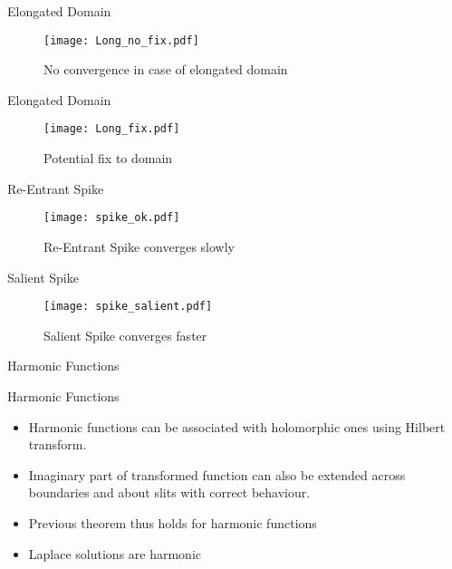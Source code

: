 \documentclass[envcountsect notes]{beamer}       %
\begin{document}
\begin{frame}{Elongated Domain}
    \begin{figure}[t]
        \vspace{-1em}
        \texttt{[image: Long\_no\_fix.pdf]}
        \vspace{-3em}
        \caption*{No convergence in case of elongated domain}
    \end{figure}
\end{frame}
\begin{frame}{Elongated Domain}
    \begin{figure}[t]
        \vspace{-1em}
        \texttt{[image: Long\_fix.pdf]}
        \vspace{-3em}
        \caption*{Potential fix to domain}
    \end{figure}
\end{frame}
\begin{frame}{Re-Entrant Spike}
    \begin{figure}[t]
        \vspace{-1em}
        \texttt{[image: spike\_ok.pdf]}
        \vspace{-3em}
        \caption*{Re-Entrant Spike converges slowly}
    \end{figure}
\end{frame}
\begin{frame}{Salient Spike}
    \begin{figure}[t]
        \vspace{-1em}
        \texttt{[image: spike\_salient.pdf]}
        \vspace{-3em}
        \caption*{Salient Spike converges faster}
    \end{figure}
\end{frame}

\begin{frame}{Harmonic Functions }
    \begin{block}{Harmonic Functions}
        \begin{itemize}
            \item Harmonic functions can be associated with holomorphic ones using Hilbert transform.
            \item Imaginary part of transformed function can also be extended across boundaries and about slits with correct behaviour.
            \item Previous theorem thus holds for harmonic functions
            \item Laplace solutions are harmonic
        \end{itemize}
    \end{block}
\end{frame}
\end{document}
